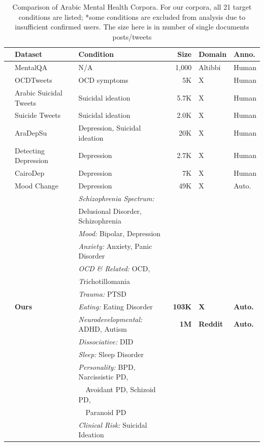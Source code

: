 \documentclass[11pt]{article}
\begin{document}
\begin{table}
\centering
\small
\begin{tabular}{cl l rll}
\toprule
& \textbf{Dataset} & \textbf{Condition} & \textbf{Size} & \textbf{Domain} & \textbf{Anno.} \\
\midrule
& MentalQA~\cite{alhuzali2024mentalqa} & N/A & 1,000 & Altibbi & Human \\
& OCDTweets~\cite{al2024classification} & OCD symptoms & 5K & X & Human \\
& Arabic Suicidal Tweets~\cite{abdulsalam2024detecting} & Suicidal ideation & 5.7K & X & Human \\
& Suicide Tweets~\cite{baghdadi2022optimized} & Suicidal ideation & 2.0K & X & Human \\
& AraDepSu~\cite{hassib2022aradepsu} & Depression, Suicidal ideation & 20K & X & Human \\
& Detecting Depression~\cite{almouzini2019detecting} & Depression & 2.7K & X & Human \\
& CairoDep~\cite{elramly2021cairodep} & Depression & 7K & X & Human \\
& Mood Change~\cite{maghraby2022mood} & Depression & 49K & X & Auto. \\
\midrule
& & \textit{Schizophrenia Spectrum:}& & & \\
& & Delusional Disorder, Schizophrenia & & & \\
& & \textit{Mood:} Bipolar, Depression & & & \\
& & \textit{Anxiety:} Anxiety, Panic Disorder & & & \\
& & \textit{OCD \& Related:} OCD, & & & \\
& & \textit Trichotillomania & & & \\

& & \textit{Trauma:} PTSD & & & \\
& \textbf{Ours} & \textit{Eating:} Eating Disorder & \textbf{103K} & \textbf{X} & \textbf{Auto.} \\
&  & \textit{Neurodevelopmental:} ADHD, Autism & \textbf{1M} & \textbf{Reddit} & \textbf{Auto.} \\
& & \textit{Dissociative:} DID & & & \\
& & \textit{Sleep:} Sleep Disorder & & & \\
& & \textit{Personality:} BPD, Narcissistic PD, & & & \\
& & ~~Avoidant PD, Schizoid PD, & & & \\
& & ~~Paranoid PD & & & \\
& & \textit{Clinical Risk:} Suicidal Ideation & & & \\
\bottomrule
\end{tabular}
\caption{Comparison of Arabic Mental Health Corpora. For our corpora, all 21 target conditions are listed; *some conditions are excluded from analysis due to insufficient confirmed users. The size here is in number of single documents posts/tweets}

\label{tab:arabic_datasets}
\end{table}
\end{document}

